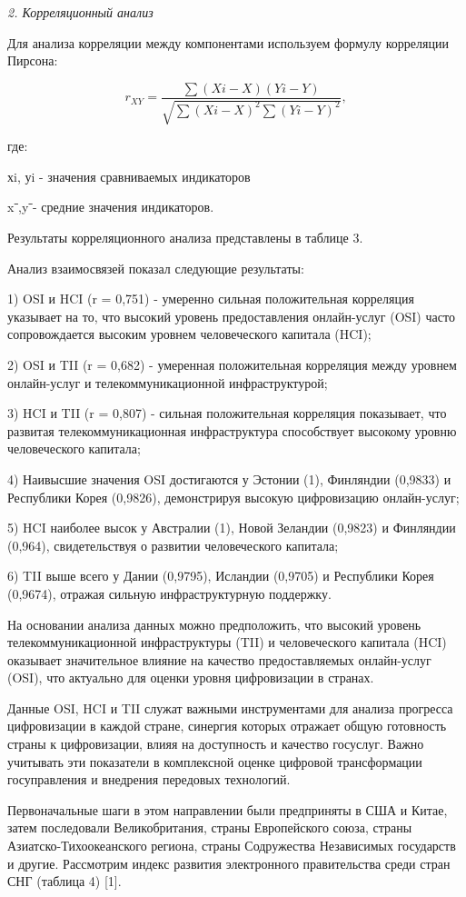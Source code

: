 \begin{multicols}{2}
\emph{2. Корреляционный анализ}

Для анализа корреляции между компонентами используем формулу корреляции
Пирсона:

\begin{equation}
    r_{XY} = \frac{\sum (Xi - X)(Yi - Y)}{\sqrt{\sum (Xi - X)^2 \sum (Yi - Y)^2}},
\end{equation}

где:

хi, уi - значения сравниваемых индикаторов

xˉ,yˉ- средние значения индикаторов.

Результаты корреляционного анализа представлены в таблице 3.

Анализ взаимосвязей показал следующие результаты:

1) OSI и HCI (r = 0,751) - умеренно сильная положительная корреляция
указывает на то, что высокий уровень предоставления онлайн-услуг (OSI)
часто сопровождается высоким уровнем человеческого капитала (HCI);

2) OSI и TII (r = 0,682) - умеренная положительная корреляция между
уровнем онлайн-услуг и телекоммуникационной инфраструктурой;

3) HCI и TII (r = 0,807) - сильная положительная корреляция показывает,
что развитая телекоммуникационная инфраструктура способствует высокому
уровню человеческого капитала;

4) Наивысшие значения OSI достигаются у Эстонии (1), Финляндии (0,9833)
и Республики Корея (0,9826), демонстрируя высокую цифровизацию
онлайн-услуг;

5) HCI наиболее высок у Австралии (1), Новой Зеландии (0,9823) и
Финляндии (0,964), свидетельствуя о развитии человеческого капитала;

6) TII выше всего у Дании (0,9795), Исландии (0,9705) и Республики Корея
(0,9674), отражая сильную инфраструктурную поддержку.

На основании анализа данных можно предположить, что высокий уровень
телекоммуникационной инфраструктуры (TII) и человеческого капитала (HCI)
оказывает значительное влияние на качество предоставляемых онлайн-услуг
(OSI), что актуально для оценки уровня цифровизации в странах.

Данные OSI, HCI и TII служат важными инструментами для анализа прогресса
цифровизации в каждой стране, синергия которых отражает общую готовность
страны к цифровизации, влияя на доступность и качество госуслуг. Важно
учитывать эти показатели в комплексной оценке цифровой трансформации
госуправления и внедрения передовых технологий.

Первоначальные шаги в этом направлении были предприняты в США и Китае,
затем последовали Великобритания, страны Европейского союза, страны
Азиатско-Тихоокеанского региона, страны Содружества Независимых
государств и другие. Рассмотрим индекс развития электронного
правительства среди стран СНГ (таблица 4) {[}1{]}.
\end{multicols}

